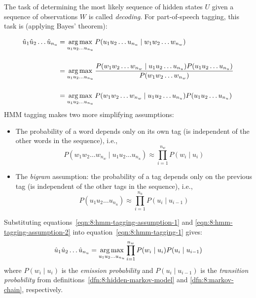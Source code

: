 The task of determining the most likely sequence of hidden states $U$ given a
sequence of observations $W$ is called \textit{decoding}.
For part-of-speech tagging, this task is (applying Bayes' theorem):

\begin{align}
  \hat{u}_1 \hat{u}_2 \dots \hat{u}_{n_u}
   & = \operatorname*{arg\,max}_{u_1 u_2 \dots u_{n_u}}
  P(u_1 u_2 \dots u_{n_u} \mid w_1 w_2 \dots w_{n_w})                                                           \\[3ex]
   & = \operatorname*{arg\,max}_{u_1 u_2 \dots u_{n_u}}
  \frac{P(w_1 w_2 \dots w_{n_w} \mid u_1 u_2 \dots u_{n_u}) P(u_1 u_2 \dots u_{n_u})}{P(w_1 w_2 \dots w_{n_w})} \\[3ex]
   & = \operatorname*{arg\,max}_{u_1 u_2 \dots u_{n_u}}
  P(w_1 w_2 \dots w_{n_w} \mid u_1 u_2 \dots u_{n_u}) P(u_1 u_2 \dots u_{n_u})
  \label{eqn:8:hmm-tagging-1}
\end{align}
HMM tagging makes two more simplifying assumptions:
\begin{itemize}
  \item The probability of a word depends only on its own tag (is independent of
        the other words in the sequence), i.e.,
        \begin{equation}
          \label{eqn:8:hmm-tagging-assumption-1}
          P(w_1 w_2 \dots w_{n_w} \mid u_1 u_2 \dots u_{n_u})
          \approx \prod_{i = 1}^{n_w} P(w_i \mid u_i)
        \end{equation}
  \item The \textit{bigram} assumption: the probability of a tag depends only on
        the previous tag (is independent of the other tags in the sequence),
        i.e.,
        \begin{equation}
          \label{eqn:8:hmm-tagging-assumption-2}
          P(u_1 u_2 \dots u_{n_u})
          \approx \prod_{i = 1}^{n_u} P(u_i \mid u_{i - 1})
        \end{equation}
\end{itemize}
Substituting equations~\ref{eqn:8:hmm-tagging-assumption-1} and
\ref{eqn:8:hmm-tagging-assumption-2} into equation~\ref{eqn:8:hmm-tagging-1}
gives:
\begin{equation}
  \hat{u}_1 \hat{u}_2 \dots \hat{u}_{n_u}
  = \operatorname*{arg\,max}_{u_1 u_2 \dots u_{n_u}}
  \prod_{i = 1}^{n_w} P(w_i \mid u_i) P(u_i \mid u_{i - 1})
\end{equation}
where $P(w_i \mid u_i)$ is the \textit{emission probability} and
$P(u_i \mid u_{i - 1})$ is the \textit{transition probability} from
definitions~\ref{dfn:8:hidden-markov-model} and \ref{dfn:8:markov-chain},
respectively.

